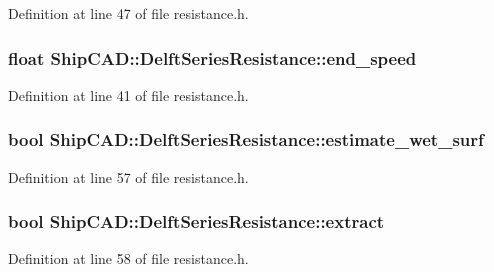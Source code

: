 Definition at line 47 of file resistance.\-h.

\hypertarget{structShipCAD_1_1DelftSeriesResistance_abd1672b905c07093735775ff455e5a98}{
\subsubsection[{end\-\_\-speed}]{\setlength{\rightskip}{0pt plus 5cm}float Ship\-C\-A\-D\-::\-Delft\-Series\-Resistance\-::end\-\_\-speed}}\label{structShipCAD_1_1DelftSeriesResistance_abd1672b905c07093735775ff455e5a98}


Definition at line 41 of file resistance.\-h.

\hypertarget{structShipCAD_1_1DelftSeriesResistance_a0507b03a9329185d961cd97739237d91}{
\subsubsection[{estimate\-\_\-wet\-\_\-surf}]{\setlength{\rightskip}{0pt plus 5cm}bool Ship\-C\-A\-D\-::\-Delft\-Series\-Resistance\-::estimate\-\_\-wet\-\_\-surf}}\label{structShipCAD_1_1DelftSeriesResistance_a0507b03a9329185d961cd97739237d91}


Definition at line 57 of file resistance.\-h.

\hypertarget{structShipCAD_1_1DelftSeriesResistance_a8276aa04952e727f1a310f10ceb72414}{
\subsubsection[{extract}]{\setlength{\rightskip}{0pt plus 5cm}bool Ship\-C\-A\-D\-::\-Delft\-Series\-Resistance\-::extract}}\label{structShipCAD_1_1DelftSeriesResistance_a8276aa04952e727f1a310f10ceb72414}


Definition at line 58 of file resistance.\-h.

